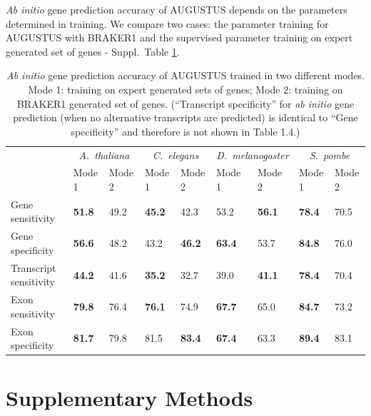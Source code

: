 \documentclass[a4paper,10pt]{report}
\begin{document}
\textit{Ab initio} gene prediction accuracy of AUGUSTUS depends on the parameters determined in training. We compare two cases: the parameter training for AUGUSTUS with BRAKER1 and the supervised parameter training on expert generated set of genes - Suppl.~Table \ref{single_preds_braker}.

\begin{table}[h!]
\caption{\textit{Ab initio} gene prediction accuracy of AUGUSTUS trained in two different modes. Mode 1: training on expert generated sets of genes; Mode 2: training on BRAKER1 generated set of genes. (``Transcript specificity'' for \textit{ab initio} gene prediction (when no alternative transcripts are predicted) is identical to ``Gene specificity'' and therefore is not shown in Table 1.4.) \label{single_preds_braker}}
\begin{center}
\begin{tabular}{lp{1.5cm}p{1.2cm}p{1.2cm}p{1.2cm}p{1.2cm}p{1.2cm}p{1.2cm}p{1.2cm}}\hline
 & \multicolumn{2}{c}{\textit{A.~thaliana}} &  \multicolumn{2}{c}{\textit{C.~elegans}} &  \multicolumn{2}{c}{\textit{D.~melanogaster}} &  \multicolumn{2}{c}{\textit{S.~pombe}}\\
 & \tiny{Mode 1} & \tiny{Mode 2} & \tiny{Mode 1} & \tiny{Mode 2} &  \tiny{Mode 1} & \tiny{Mode 2} & \tiny{Mode 1} &\tiny{Mode 2}\\
 \hline
Gene sensitivity        & \textbf{51.8} & 49.2 & \textbf{45.2} & 42.3 & 53.2 & \textbf{56.1} & \textbf{78.4} & 70.5 \\
Gene specificity        & \textbf{56.6} & 48.2 & 43.2 & \textbf{46.2} & \textbf{63.4} & 53.7 & \textbf{84.8} & 76.0  \\
Transcript sensitivity  & \textbf{44.2} & 41.6 & \textbf{35.2} & 32.7 & 39.0 & \textbf{41.1} & \textbf{78.4} & 70.4  \\
Exon sensitivity        & \textbf{79.8} & 76.4 & \textbf{76.1} & 74.9 & \textbf{67.7} & 65.0 & \textbf{84.7} & 73.2  \\
Exon specificity        & \textbf{81.7} & 79.8 & 81.5 & \textbf{83.4} & \textbf{67.4} & 63.3 & \textbf{89.4} & 83.1  \\
\hline
\end{tabular}
\end{center}
\end{table}




\chapter{Supplementary Methods}
\end{document}
